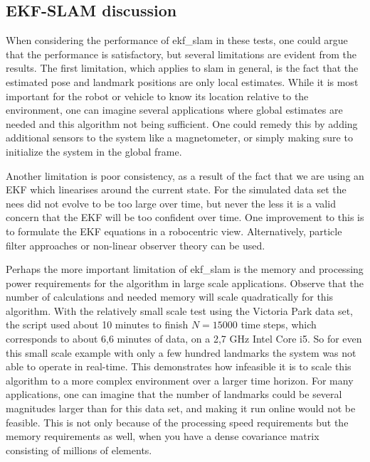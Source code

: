 
\subsection{EKF-SLAM discussion}

When considering the performance of \acrshort{ekf_slam} in these tests, one could argue that the performance is satisfactory, but several limitations are evident from the results. The first limitation, which applies to \acrshort{slam} in general, is the fact that the estimated pose and landmark positions are only local estimates. While it is most important for the robot or vehicle to know its location relative to the environment, one can imagine several applications where global estimates are needed and this algorithm not being sufficient. One could remedy this by adding additional sensors to the system like a magnetometer, or simply making sure to initialize the system in the global frame. 

Another limitation is poor consistency, as a result of the fact that we are using an EKF which linearises around the current state. For the simulated data set the \acrshort{nees} did not evolve to be too large over time, but never the less it is a valid concern that the EKF will be too confident over time\cite{ekfslam}. One improvement to this is to formulate the EKF equations in a robocentric view. Alternatively, particle filter approaches or non-linear observer theory can be used. 

Perhaps the more important limitation of \acrshort{ekf_slam} is the memory and processing power requirements for the algorithm in large scale applications. Observe that the number of calculations and needed memory will scale quadratically for this algorithm. With the relatively small scale test using the Victoria Park data set, the script used about 10 minutes to finish $N=15000$ time steps, which corresponds to about 6,6 minutes of data, on a 2,7 GHz Intel Core i5. So for even this small scale example with only a few hundred landmarks the system was not able to operate in real-time. This demonstrates how infeasible it is to scale this algorithm to a more complex environment over a larger time horizon. For many applications, one can imagine that the number of landmarks could be several magnitudes larger than for this data set, and making it run online would not be feasible. This is not only because of the processing speed requirements but the memory requirements as well, when you have a dense covariance matrix consisting of millions of elements.

